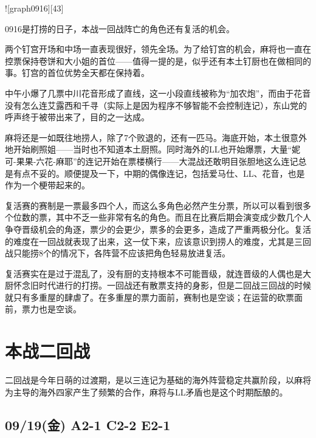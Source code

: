 ![graph0916][43]

0916是打捞的日子，本战一回战阵亡的角色还有复活的机会。

两个钉宫开场和中场一直表现很好，领先全场。为了给钉宫的机会，麻将也一直在控票保持卷饼和大小姐的首位——值得一提的是，似乎还有本土钉厨也在做相同的事。钉宫的首位优势全天都在保持着。

中午小爆了几票中川花音形成了直线，这一小段直线被称为“加农炮”，而由于花音没有怎么连艾露西和千寻（实际上是因为程序不够智能不会控制连记），东山党的呼声终于被带出来了，目的之一达成。

麻将还是一如既往地捞人，除了7个败退的，还有一匹马。海底开始，本土很意外地开始刷照姐——当时也不知道本土厨照。同时海外的LL也开始爆票，大量“妮可-果果-六花-麻耶”的连记开始在票楼横行——大混战还敢明目张胆地这么连记总是有点不妥的。顺便提及一下，中期的偶像连记，包括爱马仕、LL、花音，也是作为一个梗带起来的。

复活赛的赛制是一票最多四个人，而这么多角色必然产生分票，所以可以看到很多个位数的票，其中不乏一些非常有名的角色。而且在比赛后期会演变成少数几个人争夺晋级机会的角逐，票少的会更少，票多的会更多，造成了严重两极分化。复活的难度在一回战就表现了出来，这一仗下来，应该意识到捞人的难度，尤其是三回战只能捞8个的情况下，各阵营不应该把角色轻易放进复活。

复活赛实在是过于混乱了，没有厨的支持根本不可能晋级，就连晋级的人偶也是大厨怀念旧时代进行的打捞。一回战还有散票支持的身影，但是二回战三回战的时候就只有多重屋的肆虐了。在多重屋的票力面前，赛制也是空谈；在运营的砍票面前，票力也是空谈。

\chapter{本战二回战}

二回战是今年日萌的过渡期，是以三连记为基础的海外阵营稳定共赢阶段，以麻将为主导的海外四家产生了频繁的合作，麻将与LL矛盾也是这个时期酝酿的。

\section{09/19(金) A2-1 C2-2 E2-1}

